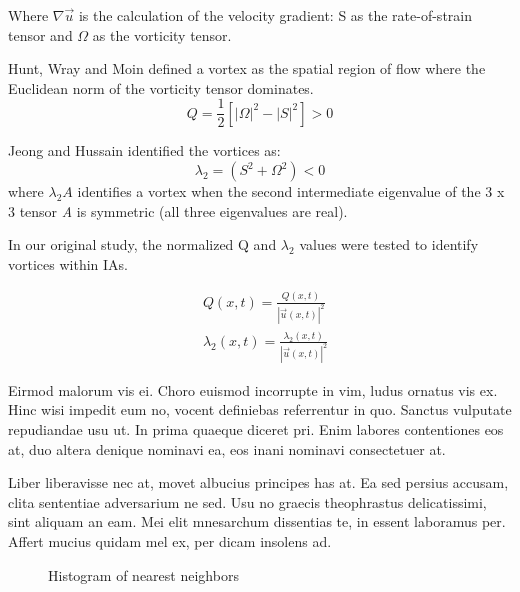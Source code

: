 Where $\nabla\vec{u}$ is the calculation of the velocity gradient: S as the rate-of-strain tensor and $\Omega$ as the vorticity tensor.

Hunt, Wray and Moin \cite{hunt1988eddies} defined a vortex as the spatial region of flow where  the Euclidean norm of the vorticity tensor dominates.
\begin{equation}
Q = \frac{1}{2}\left[|\Omega|^2 - |S|^2\right] > 0
\label{CHAPTER2_Q}
\end{equation}

Jeong and Hussain identified the vortices as:
\begin{equation}
\lambda_2 = (S^2 + \Omega^2) < 0
\label{CHAPTER2_lambda2}
\end{equation}
where $\lambda_2{A}$ identifies a vortex when the second intermediate eigenvalue of the 3 x 3 tensor \textit{A} is symmetric (all three eigenvalues are real). 

In our original study, the normalized Q and $\lambda_2$ values were tested to identify vortices within IAs.

\begin{equation}
\begin{aligned}
&Q(x,t) = \frac{Q(x,t)}{|\vec{u}(x,t)|^2} \\
&\lambda_2 (x,t) = \frac{\lambda_2 (x,t)}{|\vec{u}(x,t)|^2}
\end{aligned}
\label{CHAPTER2_normalized_Q_lambda2}
\end{equation}



Eirmod malorum vis ei. Choro euismod incorrupte in vim, ludus ornatus vis ex. 
Hinc wisi impedit eum no, vocent definiebas referrentur in quo. Sanctus 
vulputate repudiandae usu ut. In prima quaeque diceret pri. Enim labores 
contentiones eos at, duo altera denique nominavi ea, eos inani nominavi 
consectetuer at.

Liber liberavisse nec at, movet albucius principes has at. Ea sed persius 
accusam, clita sententiae adversarium ne sed. Usu no graecis theophrastus 
delicatissimi, sint aliquam an eam. Mei elit mnesarchum dissentias te, in 
essent laboramus per. Affert mucius quidam mel ex, per dicam insolens ad.

\begin{figure}[htb]
  \begin{center}
  \end{center}
  \caption{Histogram of nearest neighbors}
  \label{CHAPTER2_FIG01}
\end{figure}

